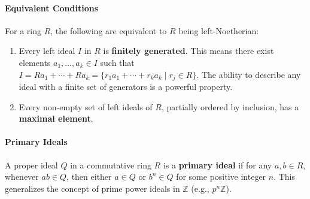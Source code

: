 \documentclass[12pt]{article}
\theoremstyle{definition}
\numberwithin{equation}{subsection}
\begin{document}
\paragraph{Equivalent Conditions} 
For a ring $R$, the following are equivalent to $R$ being left-Noetherian:
\begin{enumerate}
\item Every left ideal $I$ in $R$ is \textbf{finitely generated}. This means there exist elements $a_1, \ldots, a_k \in I$ such that $I = Ra_1 + \cdots + Ra_k = \{r_1a_1 + \cdots + r_ka_k \mid r_j \in R\}$. The ability to describe any ideal with a finite set of generators is a powerful property.
\item Every non-empty set of left ideals of $R$, partially ordered by inclusion, has a \textbf{maximal element}.
\end{enumerate}

\paragraph{Primary Ideals}
A proper ideal $Q$ in a commutative ring $R$ is a \textbf{primary ideal} if for any $a,b \in R$, whenever $ab \in Q$, then either $a \in Q$ or $b^n \in Q$ for some positive integer $n$. This generalizes the concept of prime power ideals in $\mathbb{Z}$ (e.g., $p^n\mathbb{Z}$).
\end{document}
